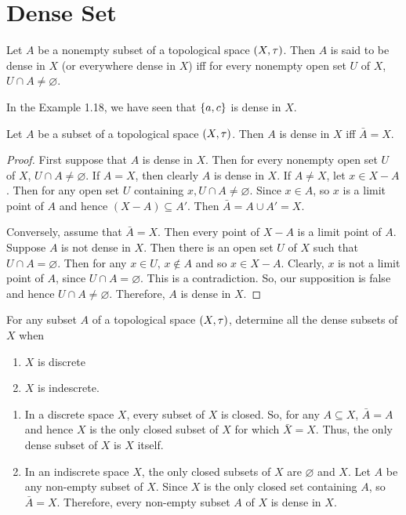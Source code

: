 \documentclass[../main-sheet.tex]{subfiles}
\begin{document}
\section{Dense Set}
\begin{defn}
    Let  \(A\) be a nonempty subset of a topological
    space  \((X, \tau)\). Then  \(A\) is said to be dense in  \(X\) (or everywhere
    dense in  \(X\)) iff for every nonempty open set  \(U\) of  \(X\),  \(U \cap A\neq \varnothing\).
\end{defn}
In the Example 1.18, we have seen that  \(\left\{a, c\right\}\) is dense in  \(X\).
\begin{thm}
    Let  \(A\) be a subset of a topological space  \((X, \tau)\).
    Then  \(A\) is dense in  \(X\) iff  \(\bar{A} = X\).
\end{thm}
\begin{proof}
    First suppose that  \(A\) is dense in  \(X\). Then for every
    nonempty open set  \(U\) of  \(X\),  \(U \cap A \neq \varnothing\). If  \(A = X\), then clearly  \(A\) is dense in  \(X\). If  \(A\neq X\), let  \(x \in X - A\). Then for any open set  \(U\) containing  \(x, U \cap A \neq \varnothing\). Since  \(x \in A\), so  \(x\) is a limit point of  \(A\) and hence  \((X-A) \subseteq A'\). Then  \(\bar{A} = A \cup A' = X\).


    Conversely, assume that  \(\bar{A} = X\). Then every point of  \(X-A\) is
    a limit point of  \(A\). Suppose  \(A\) is not dense in  \(X\). Then there is an
    open set  \(U\) of  \(X\) such that  \(U \cap A = \varnothing\). Then for any  \(x \in U,\, x \notin A\) and so  \(x \in X -A\). Clearly,  \(x\) is not a limit point of  \(A\), since  \(U \cap A = \varnothing\). This is a contradiction. So, our supposition is false and hence  \(U \cap A\neq \varnothing\). Therefore,  \(A\) is dense in  \(X\).
\end{proof}
\begin{prob}
    For any subset  \(A\) of a topological space  \((X, \tau)\), determine all the dense subsets of  \(X\) when
    \begin{enumerate}[label=(\roman*)]
        \item  \(X\) is discrete
        \item  \(X\) is indescrete.
    \end{enumerate}
\end{prob}
\begin{soln}
    \hfill
    \begin{enumerate}[label=(\roman*)]
        \item In a discrete space  \(X\), every subset of  \(X\) is closed.
        So, for any  \(A \subseteq X\),  \(\bar{A}= A\) and hence  \(X\) is the only closed subset of  \(X\) for which  \(\bar{X}=X\). Thus, the only dense subset of  \(X\) is  \(X\) itself.
        \item In an indiscrete space  \(X\), the only closed subsets of  \(X\) are  \(\varnothing\) and  \(X\). Let  \(A\) be any non-empty subset of  \(X\). Since  \(X\) is the only closed set containing  \(A\), so  \(\bar{A}= X\). Therefore, every non-empty subset  \(A\) of  \(X\) is dense in  \(X\).
    \end{enumerate}
\end{soln}
\end{document}
